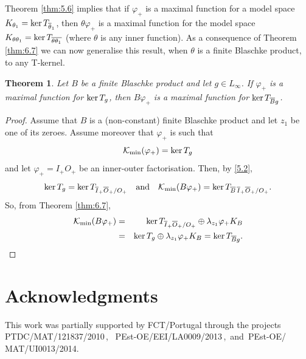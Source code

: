 \documentclass[11pt]{article}
\def\ker{\mathop{\rm ker}\nolimits}
\renewcommand\phi{\varphi}
\newtheorem{thm}{Theorem}[section]
\numberwithin{equation}{section}
\def\beginpf{\begin{proof}}
\def\endpf{\end{proof}}
\begin{document}
Theorem \ref{thm:5.6} implies that if $\phi_+$ is a maximal function for a model space $K_{\theta_1}=\ker T_{\overline\theta_1}$, then $\theta \phi_+$ is a maximal function for the model space $K_{\theta\theta_1}=\ker T_{\overline{\theta\theta_1}}$ (where $\theta$ is any inner function). As a consequence of Theorem \ref {thm:6.7} we can now generalise this result, when $\theta$ is a finite Blaschke product, to any T-kernel.



\begin{thm}\label{thm6.8} Let $B$ be a finite Blaschke product and let $g \in L_\infty$. If $\phi_+$ is a maximal function for $\ker T_g$, then $B\phi_+$ is a maximal function for $\ker T_{\overline{B}g}$.
\end{thm}
\beginpf
Assume that $B$ is a (non-constant) finite Blaschke product and let $z_1$ be one of its zeroes. Assume moreover that $\phi_+$ is such that
\[\mathcal{K}_{\min} (\phi_+)=\ker T_g \]
and let $\phi_+=I_+O_+$ be an inner-outer factorisation. Then, by \eqref{5.2},
\[\ker T_g= \ker T_{\overline{I}_+\overline{O}_+/O_+} \quad \text 
{and}\quad \mathcal{K}_{\min} (B\phi_+)=\ker T_{\overline{B}\,\overline{I}_+\overline{O}_+/O_+}. \]
So, from Theorem \ref{thm:6.7},
\begin{eqnarray*}
\mathcal{K}_{\min} (B\phi_+)&=&\ker T_{\overline{I}_+\overline{O}_+/O_+} \oplus \lambda_{z_1}\phi_+ K_B \\
&=& \ker T_g \oplus \lambda_{z_1}\phi_+ K_B = \ker T_{\overline{B}g}.
\end{eqnarray*}
\endpf










\section*{Acknowledgments}

This work was partially supported by FCT/Portugal through the projects
PTDC/MAT/121837/2010\,, \, PEst-OE/EEI/LA0009/2013\,, \,and\, PEst-OE/\\MAT/UI0013/2014.
\end{document}
